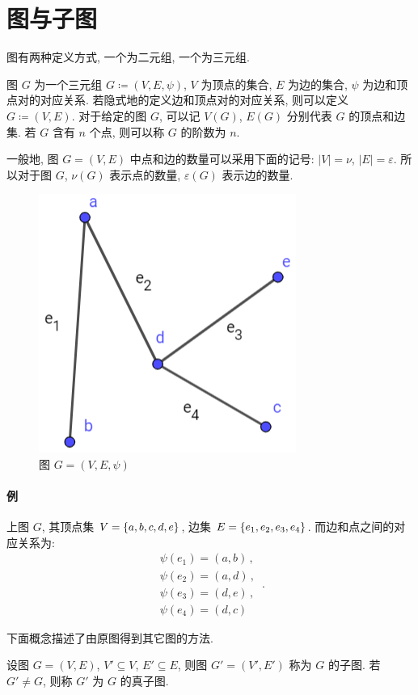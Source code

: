 \documentclass[UTF8]{ctexart}
\theoremstyle{mystyle}
\theoremstyle{myremark}
\theoremstyle{plain}
\DeclarePairedDelimiter\set{\{}{\}}
\begin{document}
\section{图与子图}

图有两种定义方式, 一个为二元组, 一个为三元组.

\begin{definition}[\text{图}]
    图 $ G $ 为一个三元组 $ G \coloneqq (V, E, \psi) $, $ V $ 为顶点的集合, $ E $ 为边的集合, $ \psi $ 为边和顶点对的对应关系. 若隐式地的定义边和顶点对的对应关系, 则可以定义 $ G \coloneqq (V, E) $. 对于给定的图 $ G $, 可以记 $ V(G) $, $ E(G) $ 分别代表 $ G $ 的顶点和边集. 若 $ G $ 含有 $ n $ 个点, 则可以称 $ G $ 的阶数为 $ n $.
\end{definition}

一般地, 图 $ G = (V, E) $ 中点和边的数量可以采用下面的记号: $ |V| = \nu $, $ |E| = \varepsilon $. 所以对于图 $ G $, $ \nu(G) $ 表示点的数量, $ \varepsilon(G) $ 表示边的数量.

\begin{figure}[H]
    \centering
    \includegraphics[width = 0.35\linewidth]{./images/graph_definition.png}
    \caption{图 $ G = (V, E, \psi) $}
\end{figure}

\paragraph{例}
上图 $ G $, 其顶点集 $ V = \set{a, b, c, d, e} $, 边集 $ E = \set{e_1, e_2, e_3, e_4} $. 而边和点之间的对应关系为:
\[ \begin{array}{c}
    \psi(e_1) = (a, b) \,,\\
    \psi(e_2) = (a, d) \,,\\
    \psi(e_3) = (d, e) \,,\\
    \psi(e_4) = (d, c)
\end{array} \,.\]

下面概念描述了由原图得到其它图的方法.
\begin{definition}[\text{子图}]
    设图 $ G = (V, E) $, $ V' \subseteq V $, $ E' \subseteq E $, 则图 $ G' = (V', E') $ 称为 $ G $ 的子图. 若 $ G' \neq G $, 则称 $ G' $ 为 $ G $ 的真子图.
\end{definition}
\end{document}
